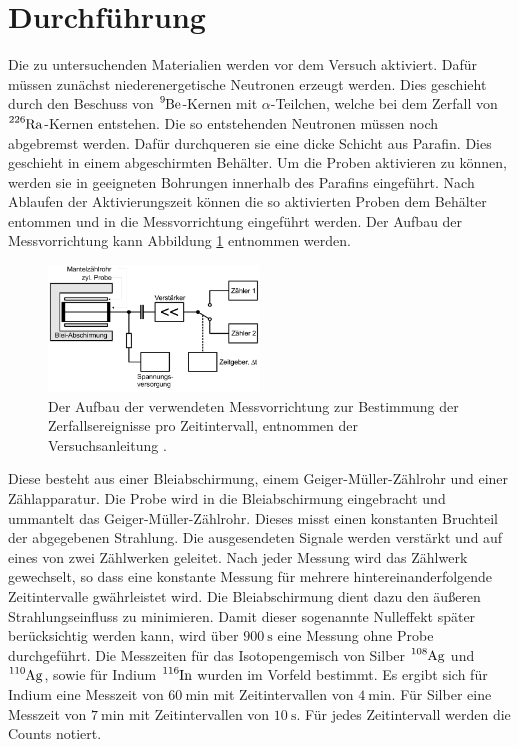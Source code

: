 \section{Durchführung}
\label{sec:Durchführung}

Die zu untersuchenden Materialien werden vor dem Versuch aktiviert.
Dafür müssen zunächst niederenergetische Neutronen erzeugt werden.
Dies geschieht durch den Beschuss von $\ce{^{9}Be}$-Kernen mit $\alpha$-Teilchen, welche bei dem Zerfall von $\ce{^{226}Ra}$-Kernen entstehen.
Die so entstehenden Neutronen müssen noch abgebremst werden.
Dafür durchqueren sie eine dicke Schicht aus Parafin.
Dies geschieht in einem abgeschirmten Behälter.
Um die Proben aktivieren zu können, werden sie in geeigneten Bohrungen innerhalb des Parafins eingeführt.
Nach Ablaufen der Aktivierungszeit können die so aktivierten Proben dem Behälter entommen und in die Messvorrichtung eingeführt werden.
Der Aufbau der Messvorrichtung kann Abbildung \ref{fig:Aufbau} entnommen werden.
\FloatBarrier
\begin{figure}
  \centering
  \includegraphics[width=0.5\textwidth]{images/Aufbau.png}
  \caption{Der Aufbau der verwendeten Messvorrichtung zur Bestimmung der Zerfallsereignisse pro Zeitintervall, entnommen der Versuchsanleitung \cite[8]{sample}.}
  \label{fig:Aufbau}
\end{figure}
\FloatBarrier
Diese besteht aus einer Bleiabschirmung, einem Geiger-Müller-Zählrohr und einer Zählapparatur.
Die Probe wird in die Bleiabschirmung eingebracht und ummantelt das Geiger-Müller-Zählrohr.
Dieses misst einen konstanten Bruchteil der abgegebenen Strahlung.
Die ausgesendeten Signale werden verstärkt und auf eines von zwei Zählwerken geleitet.
Nach jeder Messung wird das Zählwerk gewechselt, so dass eine konstante Messung für mehrere hintereinanderfolgende Zeitintervalle gwährleistet wird.
Die Bleiabschirmung dient dazu den äußeren Strahlungseinfluss zu minimieren.
Damit dieser sogenannte Nulleffekt später berücksichtig werden kann, wird über $\SI{900}{\second}$ eine Messung ohne Probe durchgeführt.
Die Messzeiten für das Isotopengemisch von Silber $\ce{^{108}Ag}$ und $\ce{^{110}Ag}$, sowie für Indium $\ce{^{116}In}$ wurden im Vorfeld bestimmt.
Es ergibt sich für Indium eine Messzeit von $\SI{60}{\minute}$ mit Zeitintervallen von $\SI{4}{\minute}$.
Für Silber eine Messzeit von $\SI{7}{\minute}$ mit Zeitintervallen von $\SI{10}{\second}$.
Für jedes Zeitintervall werden die Counts notiert.
